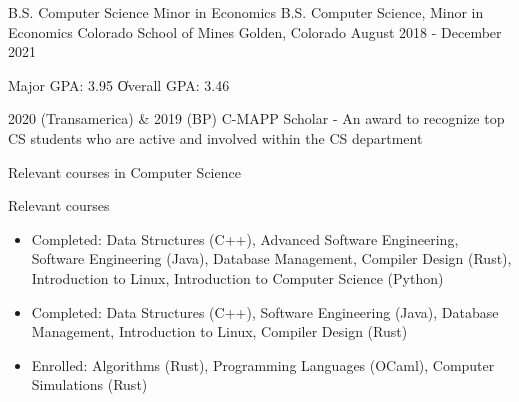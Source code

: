 \vspace{-2.0mm}


\begin{cventries}

  \cventry
    {\ifcv B.S. Computer Science \newline \vspace{-1mm} Minor in Economics \else B.S. Computer Science, Minor in Economics \fi}
    {Colorado School of Mines} %
    {Golden, Colorado} %
    {August 2018 - December 2021} %
    {
      \begin{cvitems} %
        \item {Major GPA: 3.95 \| Overall GPA: 3.46}
    \item {2020 (Transamerica) \& 2019 (BP) C-MAPP Scholar - An award to recognize top CS students who are active and involved within the CS department}
        \ifcv
        \item {Relevant courses in Computer Science}
        \else
        \item {Relevant courses}
        \fi
        \begin {itemize}
        \ifcv
               \item {Completed: Data Structures (C++), Advanced Software Engineering, Software
    Engineering (Java), Database Management, Compiler Design (Rust), Introduction to Linux, Introduction to Computer Science (Python)}
    \else
    \item {Completed: Data Structures (C++), Software
    Engineering (Java), Database Management, Introduction to Linux, Compiler Design (Rust)}
    \fi
        \item {Enrolled: Algorithms (Rust), Programming Languages (OCaml), Computer Simulations (Rust)}

\end{itemize}
\end{cvitems}}
\end{cventries}
